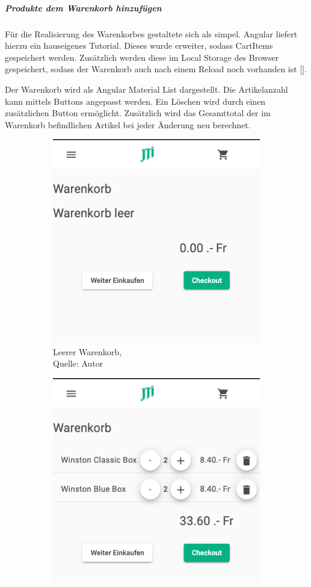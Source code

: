\subparagraph{Produkte dem Warenkorb hinzufügen}
Für die Realisierung des Warenkorbes gestaltete sich als simpel. Angular liefert hierzu ein hauseigenes Tutorial. Dieses wurde erweiter, sodass CartItems gespeichert werden. Zusätzlich werden diese im Local Storage des Browser gespeichert, sodass der Warenkorb auch nach einem Reload noch vorhanden ist [\cite{cartAngular}].

Der Warenkorb wird als Angular Material List dargestellt. Die Artikelanzahl kann mittels Buttons angepasst werden. Ein Löschen wird durch einen zusätzlichen Button ermöglicht. Zusätzlich wird das Gesamttotal der im Warenkorb befindlichen Artikel bei jeder Änderung neu berechnet. 

\begin{figure}[h]
	\begin{subfigure}[b]{0.4\textwidth}
		\includegraphics[scale=0.4]{images/cartEmpty.PNG}
		\caption[Leerer Warenkorb]{Leerer Warenkorb,\\ Quelle: Autor}
		\label{img: cartEmpty}
	\end{subfigure}
	\hfill
	\begin{subfigure}[b]{0.4\textwidth}
		\includegraphics[scale=0.4]{images/cartFull.PNG}

\end{subfigure}
\end{figure}
